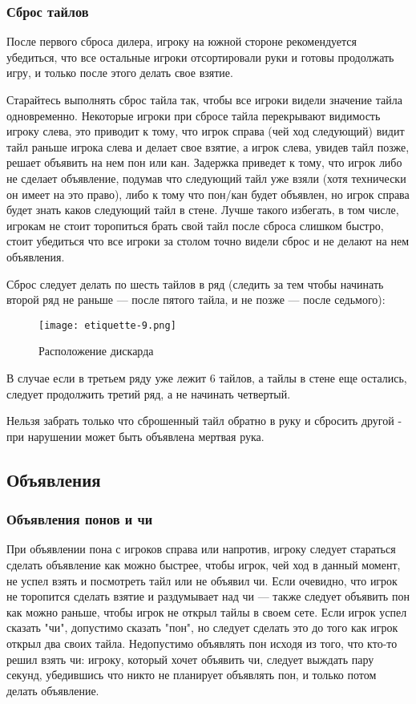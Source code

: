 \subsubsection{Сброс тайлов}

После первого сброса дилера, игроку на южной стороне рекомендуется убедиться, что все остальные игроки отсортировали руки и готовы продолжать игру, и только после этого делать свое взятие.

Старайтесь выполнять сброс тайла так, чтобы все игроки видели значение тайла одновременно. Некоторые игроки при сбросе тайла перекрывают видимость игроку слева, это приводит к тому, что игрок справа (чей ход следующий) видит тайл раньше игрока слева и делает свое взятие, а игрок слева, увидев тайл позже, решает объявить на нем пон или кан. Задержка приведет к тому, что игрок либо не сделает объявление, подумав что следующий тайл уже взяли (хотя технически он имеет на это право), либо к тому что пон/кан будет объявлен, но игрок справа будет знать каков следующий тайл в стене. Лучше такого избегать, в том числе, игрокам не стоит торопиться брать свой тайл после сброса слишком быстро, стоит убедиться что все игроки за столом точно видели сброс и не делают на нем объявления.

Сброс следует делать по шесть тайлов в ряд (следить за тем чтобы начинать второй ряд не раньше --- после пятого тайла, и не позже --- после седьмого):

\begin{figure}[H]
	\centering
	\texttt{[image: etiquette-9.png]}
	\caption{Расположение дискарда}
\end{figure}

В случае если в третьем ряду уже лежит 6 тайлов, а тайлы в стене еще остались, следует продолжить третий ряд, а не начинать четвертый.

Нельзя забрать только что сброшенный тайл обратно в руку и сбросить другой - при нарушении может быть объявлена мертвая рука.

\subsection{Объявления}

\subsubsection{Объявления понов и чи}

При объявлении пона с игроков справа или напротив, игроку следует стараться сделать объявление как можно быстрее, чтобы игрок, чей ход в данный момент, не успел взять и посмотреть тайл или не объявил чи. Если очевидно, что игрок не торопится сделать взятие и раздумывает над чи --- также следует объявить пон как можно раньше, чтобы игрок не открыл тайлы в своем сете. Если игрок успел сказать "чи", допустимо сказать "пон", но следует сделать это до того как игрок открыл два своих тайла. Недопустимо объявлять пон исходя из того, что кто-то решил взять чи: игроку, который хочет объявить чи, следует выждать пару секунд, убедившись что никто не планирует объявлять пон, и только потом делать объявление.

